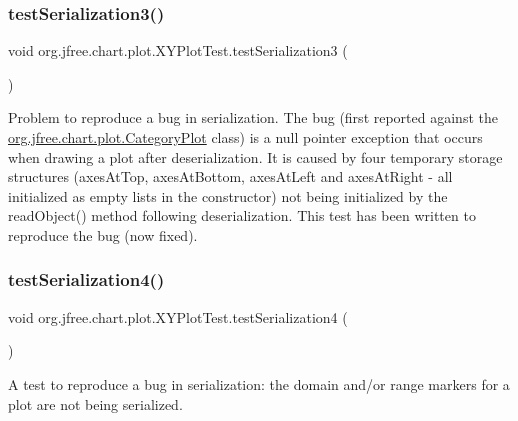 \subsubsection{\texorpdfstring{test\+Serialization3()}{testSerialization3()}}
{\footnotesize\ttfamily void org.\+jfree.\+chart.\+plot.\+X\+Y\+Plot\+Test.\+test\+Serialization3 (\begin{DoxyParamCaption}{ }\end{DoxyParamCaption})}

Problem to reproduce a bug in serialization. The bug (first reported against the \mbox{\hyperlink{classorg_1_1jfree_1_1chart_1_1plot_1_1_category_plot}{org.\+jfree.\+chart.\+plot.\+Category\+Plot}} class) is a null pointer exception that occurs when drawing a plot after deserialization. It is caused by four temporary storage structures (axes\+At\+Top, axes\+At\+Bottom, axes\+At\+Left and axes\+At\+Right -\/ all initialized as empty lists in the constructor) not being initialized by the read\+Object() method following deserialization. This test has been written to reproduce the bug (now fixed). \mbox{\label{classorg_1_1jfree_1_1chart_1_1plot_1_1_x_y_plot_test_a745fcea1d71c2539ae40835bf969dbc1}} 
\subsubsection{\texorpdfstring{test\+Serialization4()}{testSerialization4()}}
{\footnotesize\ttfamily void org.\+jfree.\+chart.\+plot.\+X\+Y\+Plot\+Test.\+test\+Serialization4 (\begin{DoxyParamCaption}{ }\end{DoxyParamCaption})}

A test to reproduce a bug in serialization\+: the domain and/or range markers for a plot are not being serialized. \mbox{\label{classorg_1_1jfree_1_1chart_1_1plot_1_1_x_y_plot_test_a343a13fa716773a6532250a2f6680358}} 
